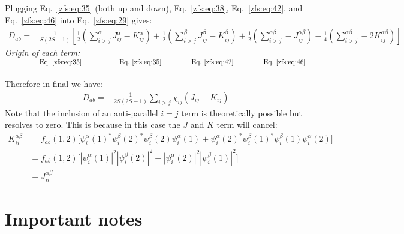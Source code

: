 Plugging Eq.~\ref{zfs:eq:35} (both up and down), Eq.~\ref{zfs:eq:38}, Eq.~\ref{zfs:eq:42}, and Eq.~\ref{zfs:eq:46} into Eq.~\ref{zfs:eq:29} gives:
\begin{align}
    D_{ab}
    =&\frac{1}{S(2S-1)} \left[
        \frac{1}{2}(\sum_{i>j}^{\alpha}J_{ij}^{\alpha} - K_{ij}^{\alpha})
        +\frac{1}{2}(\sum_{i>j}^{\beta}J_{ij}^{\beta} - K_{ij}^{\beta})
        +\frac{1}{2}(\sum_{i>j}^{\alpha\beta}-J_{ij}^{\alpha\beta})
        -\frac{1}{4}(\sum_{i>j}^{\alpha\beta}-2K_{ij}^{\alpha\beta})
        \right]
\end{align}
\textit{Origin of each term:} $\hspace{1.7cm}\text{Eq.~\ref{zfs:eq:35}}
\hspace{1.9cm}\text{Eq.~\ref{zfs:eq:35}}
\hspace{1.5cm}\text{Eq.~\ref{zfs:eq:42}}
\hspace{1.5cm}\text{Eq.~\ref{zfs:eq:46}}$\\
\\
Therefore in final we have:
\begin{align}
    D_{ab}
    =&\frac{1}{2S(2S-1)}
        \sum_{i>j}\chi_{ij}(J_{ij} - K_{ij})
\end{align}
Note that the inclusion of an anti-parallel $i=j$ term is theoretically possible but resolves to zero. This is because in this case the $J$ and $K$ term will cancel:
\begin{align}
    K_{ii}^{\alpha\beta} &= f_{ab}(1,2) \bigg[
    \psi_i^\alpha(1)^*\psi_i^\beta(2)^*\psi_i^\beta(2)\psi_i^\alpha(1)
    + \psi_i^\alpha(2)^*\psi_i^\beta(1)^*\psi_i^\beta(1)\psi_i^\alpha(2)
    \bigg]  \\
    &=f_{ab}(1,2) \bigg[
    |\psi_i^\alpha(1)|^2|\psi_i^\beta(2)|^2
    + |\psi_i^\alpha(2)|^2|\psi_i^\beta(1)|^2
    \bigg] \\
    &= J_{ii}^{\alpha\beta}
\end{align}


\section{Important notes}

